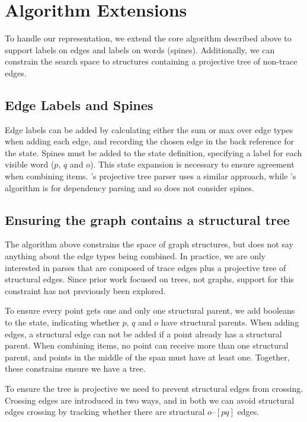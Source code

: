 \section{Algorithm Extensions}
To handle our representation, we extend the core algorithm described above to support labels on edges and labels on words (spines).
Additionally, we can constrain the search space to structures containing a projective tree of non-trace edges.

\subsection{Edge Labels and Spines}\label{sec:labels}
Edge labels can be added by calculating either the sum or max over edge types when adding each edge, and recording the chosen edge in the back reference for the state.
Spines must be added to the state definition, specifying a label for each visible word ($p$, $q$ and $o$).
This state expansion is necessary to ensure agreement when combining items.
\textcite{cck}'s projective tree parser uses a similar approach, while \textcite{ec}'s algorithm is for dependency parsing and so does not consider spines.

\subsection{Ensuring the graph contains a structural tree}
The algorithm above constrains the space of graph structures, but does not say anything about the edge types being combined.
In practice, we are only interested in parses that are composed of trace edges plus a projective tree of structural edges.
Since prior work focused on trees, not graphs, support for this constraint has not previously been explored.

To ensure every point gets one and only one structural parent, we add booleans to the state, indicating whether $p$, $q$ and $o$ have structural parents.
When adding edges, a structural edge can not be added if a point already has a structural parent.
When combining items, no point can receive more than one structural parent, and points in the middle of the span must have at least one.
Together, these constrains ensure we have a tree.

To ensure the tree is projective we need to prevent structural edges from crossing.
Crossing edges are introduced in two ways, and in both we can avoid structural edges crossing by tracking whether there are structural $o$--$[pq]$ edges.

